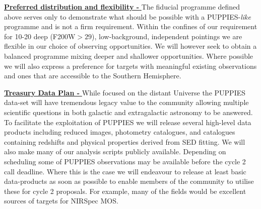 \documentclass[12pt]{article}
\begin{document}
\vspace{2mm}
\noindent
\underline{\bf Preferred distribution and flexibility - } The fiducial programme defined above serves only to demonstrate what should be possible with a PUPPIES-\emph{like} programme and is not a firm requirement. Within the confines of our requirement for 10-20 deep (F200W$>29$), low-background, independent pointings we are flexible in our choice of observing opportunities. We will however seek to obtain a balanced programme mixing deeper and shallower opportunities. Where possible we will also express a preference for targets with meaningful existing observations and ones that are accessible to the Southern Hemisphere.

\vspace{2mm}
\noindent
\underline{\bf Treasury Data Plan - } While focused on the distant Universe the PUPPIES data-set will have tremendous legacy value to the community allowing multiple scientific questions in both galactic and extragalactic astronomy to be answered. To facilitate the exploitation of PUPPIES we will release several high-level data products including reduced images, photometry catalogues, and catalogues containing redshifts and physical properties derived from SED fitting. We will also make many of our analysis scripts publicly available. 
Depending on scheduling some of PUPPIES observations may be available before the cycle 2 call deadline. Where this is the case we will endeavour to release at least basic data-products as soon as possible to enable members of the community to utilise these for cycle 2 proposals. For example, many of the fields would be excellent sources of targets for NIRSpec MOS.









%
%
\specialreq             %


%
%
\vspace{-5mm}
\coordinatedobs %
\end{document}
